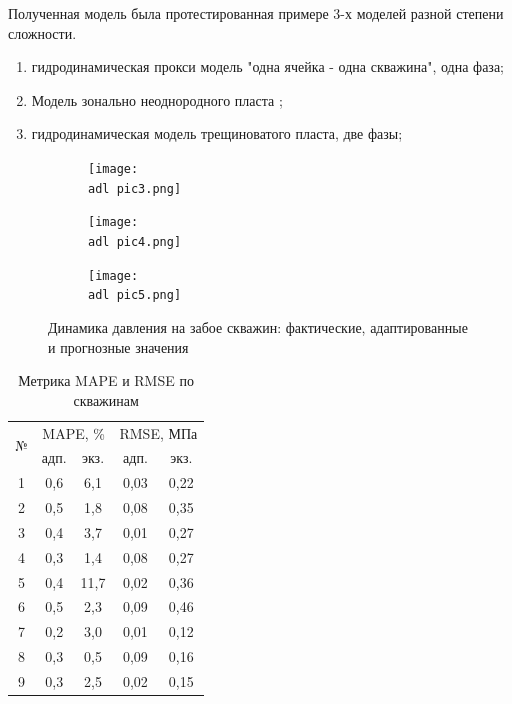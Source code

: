 \documentclass[14pt]{article}
\def \adl {adl/}
\begin{document}
Полученная модель была протестированная примере 3-х моделей разной степени сложности.
\begin{enumerate}
	\item гидродинамическая прокси модель "одна ячейка - одна скважина", одна фаза;
	\item Модель зонально неоднородного пласта ;
	\item гидродинамическая модель трещиноватого пласта, две фазы;
\end{enumerate}

\begin{figure}
	\begin{subfigure}{\textwidth}
		\centering
		\texttt{[image: \\adl pic3.png]}
		\caption{}
		\label{fig:p_a}
	\end{subfigure}
	\begin{subfigure}{\textwidth}
		\centering
		\texttt{[image: \\adl pic4.png]}
		\caption{}
		\label{fig:p_b}
	\end{subfigure}
	\begin{subfigure}{\textwidth}
		\centering
		\texttt{[image: \\adl pic5.png]}
		\caption{}
		\label{fig:p_c}
	\end{subfigure}
	\caption{Динамика давления на забое скважин: фактические, адаптированные и прогнозные значения}
	\label{fig:m1_press_abc}
\end{figure}

\begin{table}[h!]
	\caption{Метрика MAPE и RMSE по скважинам}	
	\label{tabl:MAPE_RMSE}	
	\begin{center}
		\begin{tabular}{|c||c|c||c|c|}
			\hline
			\multirow{2}{*}{№} & \multicolumn{2}{c||}{MAPE, \%} & \multicolumn{2}{c|}{RMSE, МПа} \\\cline{2-5}
			& адп. & экз. & адп. & экз. \\
			\hline
			1 & 0,6 & 6,1 & 0,03 & 0,22 \\
			\hline
			2 & 0,5 & 1,8 & 0,08 & 0,35 \\
			\hline
			3 & 0,4 & 3,7 & 0,01 & 0,27 \\
			\hline
			4 & 0,3 & 1,4 & 0,08 & 0,27 \\
			\hline
			5 & 0,4 & 11,7 & 0,02 & 0,36 \\
			\hline
			6 & 0,5 & 2,3 & 0,09 & 0,46 \\
			\hline
			7 & 0,2 & 3,0 & 0,01 & 0,12 \\
			\hline
			8 & 0,3 & 0,5 & 0,09 & 0,16 \\
			\hline
			9 & 0,3 & 2,5 & 0,02 & 0,15 \\
			\hline
		\end{tabular}
	\end{center}
\end{table}
\end{document}
